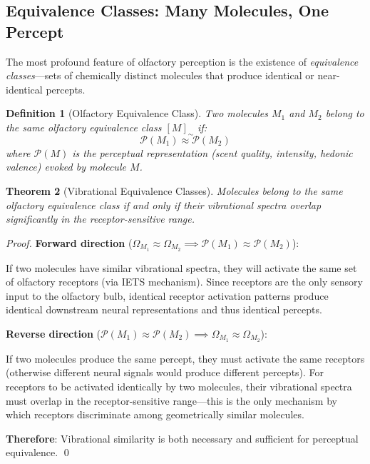\documentclass[11pt]{article}
\newtheorem{theorem}{Theorem}[section]
\newtheorem{definition}[theorem]{Definition}
\theoremstyle{remark}
\begin{document}
\subsection{Equivalence Classes: Many Molecules, One Percept}

The most profound feature of olfactory perception is the existence of \textit{equivalence classes}—sets of chemically distinct molecules that produce identical or near-identical percepts.

\begin{definition}[Olfactory Equivalence Class]
\label{def:olfactory_equivalence}
Two molecules $M_1$ and $M_2$ belong to the same olfactory equivalence class $[M]_{\sim}$ if:
\begin{equation}
\mathcal{P}(M_1) \approx \mathcal{P}(M_2)
\end{equation}
where $\mathcal{P}(M)$ is the perceptual representation (scent quality, intensity, hedonic valence) evoked by molecule $M$.
\end{definition}

\begin{theorem}[Vibrational Equivalence Classes]
\label{thm:vibrational_equivalence}
Molecules belong to the same olfactory equivalence class if and only if their vibrational spectra overlap significantly in the receptor-sensitive range.
\end{theorem}

\begin{proof}
\textbf{Forward direction} ($\Omega_{M_1} \approx \Omega_{M_2} \implies \mathcal{P}(M_1) \approx \mathcal{P}(M_2)$):

If two molecules have similar vibrational spectra, they will activate the same set of olfactory receptors (via IETS mechanism). Since receptors are the only sensory input to the olfactory bulb, identical receptor activation patterns produce identical downstream neural representations and thus identical percepts.

\textbf{Reverse direction} ($\mathcal{P}(M_1) \approx \mathcal{P}(M_2) \implies \Omega_{M_1} \approx \Omega_{M_2}$):

If two molecules produce the same percept, they must activate the same receptors (otherwise different neural signals would produce different percepts). For receptors to be activated identically by two molecules, their vibrational spectra must overlap in the receptor-sensitive range—this is the only mechanism by which receptors discriminate among geometrically similar molecules.

\textbf{Therefore}: Vibrational similarity is both necessary and sufficient for perceptual equivalence. \qed
\end{proof}
\end{document}
